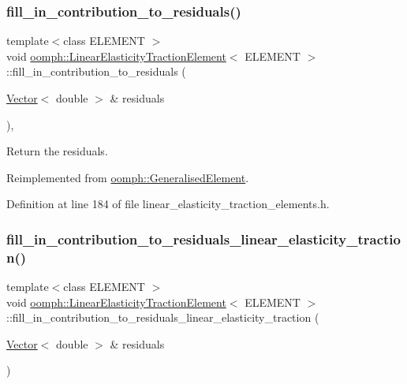 \subsubsection{\texorpdfstring{fill\+\_\+in\+\_\+contribution\+\_\+to\+\_\+residuals()}{fill\_in\_contribution\_to\_residuals()}}
{\footnotesize\ttfamily template$<$class E\+L\+E\+M\+E\+NT $>$ \\
void \hyperlink{classoomph_1_1LinearElasticityTractionElement}{oomph\+::\+Linear\+Elasticity\+Traction\+Element}$<$ E\+L\+E\+M\+E\+NT $>$\+::fill\+\_\+in\+\_\+contribution\+\_\+to\+\_\+residuals (\begin{DoxyParamCaption}\item[{\hyperlink{classoomph_1_1Vector}{Vector}$<$ double $>$ \&}]{residuals }\end{DoxyParamCaption})\hspace{0.3cm}{\ttfamily [inline]}, {\ttfamily [virtual]}}



Return the residuals. 



Reimplemented from \hyperlink{classoomph_1_1GeneralisedElement_a310c97f515e8504a48179c0e72c550d7}{oomph\+::\+Generalised\+Element}.



Definition at line 184 of file linear\+\_\+elasticity\+\_\+traction\+\_\+elements.\+h.

\mbox{\label{classoomph_1_1LinearElasticityTractionElement_a5a51ebdfb9ad2b79b7c4367a0577330e}} 
\subsubsection{\texorpdfstring{fill\+\_\+in\+\_\+contribution\+\_\+to\+\_\+residuals\+\_\+linear\+\_\+elasticity\+\_\+traction()}{fill\_in\_contribution\_to\_residuals\_linear\_elasticity\_traction()}}
{\footnotesize\ttfamily template$<$class E\+L\+E\+M\+E\+NT $>$ \\
void \hyperlink{classoomph_1_1LinearElasticityTractionElement}{oomph\+::\+Linear\+Elasticity\+Traction\+Element}$<$ E\+L\+E\+M\+E\+NT $>$\+::fill\+\_\+in\+\_\+contribution\+\_\+to\+\_\+residuals\+\_\+linear\+\_\+elasticity\+\_\+traction (\begin{DoxyParamCaption}\item[{\hyperlink{classoomph_1_1Vector}{Vector}$<$ double $>$ \&}]{residuals }\end{DoxyParamCaption})\hspace{0.3cm}{\ttfamily [protected]}}



